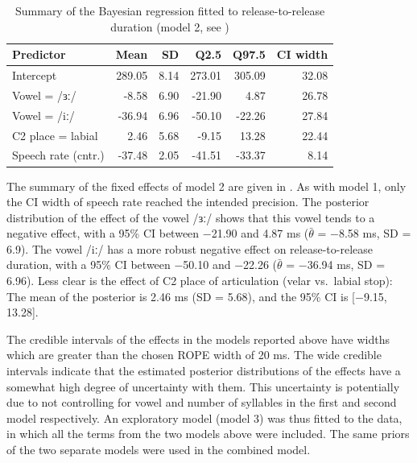 \documentclass[12pt,a4paper,]{article}
\begin{document}
\begin{table}

\caption{\label{tab:rr-2-table}Summary of the Bayesian regression fitted to release-to-release duration (model 2, see )}
\centering
\fontsize{8}{10}\selectfont
\begin{tabular}[t]{lrrrrr}
\toprule
Predictor & Mean & SD & Q2.5 & Q97.5 & CI width\\
\midrule
Intercept & 289.05 & 8.14 & 273.01 & 305.09 & 32.08\\
Vowel = /ɜː/ & -8.58 & 6.90 & -21.90 & 4.87 & 26.78\\
Vowel = /iː/ & -36.94 & 6.96 & -50.10 & -22.26 & 27.84\\
C2 place = labial & 2.46 & 5.68 & -9.15 & 13.28 & 22.44\\
Speech rate (cntr.) & -37.48 & 2.05 & -41.51 & -33.37 & 8.14\\
\bottomrule
\end{tabular}
\end{table}

The summary of the fixed effects of model 2 are given in
. As with model 1, only the CI width of speech rate
reached the intended precision. The posterior distribution of the effect
of the vowel /ɜː/ shows that this vowel tends to a negative effect, with
a 95\% CI between −21.90 and 4.87 ms (\(\bar{\theta}\) = −8.58 ms, SD =
6.9). The vowel /iː/ has a more robust negative effect on
release-to-release duration, with a 95\% CI between −50.10 and −22.26
(\(\bar{\theta}\) = −36.94 ms, SD = 6.96). Less clear is the effect of
C2 place of articulation (velar vs.~labial stop): The mean of the
posterior is 2.46 ms (SD = 5.68), and the 95\% CI is {[}−9.15, 13.28{]}.

The credible intervals of the effects in the models reported above have
widths which are greater than the chosen ROPE width of 20 ms. The wide
credible intervals indicate that the estimated posterior distributions
of the effects have a somewhat high degree of uncertainty with them.
This uncertainty is potentially due to not controlling for vowel and
number of syllables in the first and second model respectively. An
exploratory model (model 3) was thus fitted to the data, in which all
the terms from the two models above were included. The same priors of
the two separate models were used in the combined model.
\end{document}
